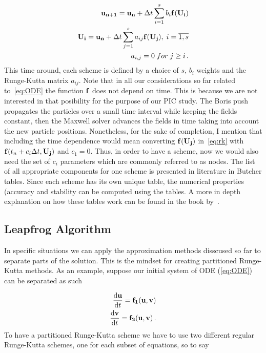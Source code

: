 \documentclass[12pt, class=report, crop=false]{standalone}
\begin{document}
\begin{subequations}
  \begin{align}
    \vb{u_{n+1}} = \vb{u_n} + \Delta t \sum_{i=1}^s b_i \vb{f}(\vb{U_i}) \\
    \label{eq:rk}
    \vb{U_i} = \vb{u_n} + \Delta t \sum_{j=1}^s a_{ij} \vb{f}(\vb{U_j}),\; i = \overline{1,s}\\
    a_{i,j}=0\; for\; j\geq i\,.
  \end{align}
\end{subequations}
This time around, each scheme is defined by a choice of \(s\), \(b_i\) weights and the Runge-Kutta matrix \(a_{ij}\). Note that in all our considerations so far related to~\cref{eq:ODE} the function \(\vb{f}\) does not depend on time. This is because we are not interested in that posibility for the purpose of our PIC study. The Boris push propagates the particles over a small time interval while keeping the fields constant, then the Maxwell solver advances the fields in time taking into account the new particle positions. Nonetheless, for the sake of completion, I mention that including the time dependence would mean converting \(\vb{f}(\vb{U_j})\) in~\cref{eq:rk} with \(\vb{f}(t_n + c_i \Delta t, \vb{U_j})\) and \(c_1 =0\). Thus, in order to have a scheme, now we would also need the set of \(c_i\) parameters which are commonly referred to as nodes. The list of all appropriate components for one scheme is presented in literature in Butcher tables. Since each scheme has its own unique table, the numerical properties (accuracy and stability can be computed using the tables. A more in depth explanation on how these tables work can be found in the book by~\cite{butcherNumericalMethodsOrdinary2008}.

\subsection{Leapfrog Algorithm}

In specific situations we can apply the approximation methods disscused so far to separate parts of the solution. This is the mindset for creating partitioned Runge-Kutta methods. As an example, suppose our initial system of ODE (\cref{eq:ODE}) can be separated as such

\begin{subequations}
  \begin{align}
    \dv{\vb{u}}{t} = \vb{f_1}(\vb{u}, \vb{v})\\
    \dv{\vb{v}}{t} = \vb{f_2}(\vb{u}, \vb{v})\,.
  \end{align}
\end{subequations}
To have a partitioned Runge-Kutta scheme we have to use two different regular Runge-Kutta schemes, one for each subset of equations, so to say
\end{document}
